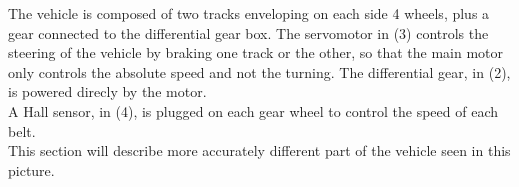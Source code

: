 The vehicle is composed of two tracks enveloping on each side 4 wheels, plus a gear connected to the differential gear box. The servomotor in (3) controls the steering of the vehicle by braking one track or the other, so that the main motor only controls the absolute speed and not the turning. The differential gear, in (2), is powered direcly by the motor.\\
A Hall sensor, in (4), is plugged on each gear wheel to control the speed of each belt.\\
 This section will describe more accurately different part of the vehicle seen in this picture.\\